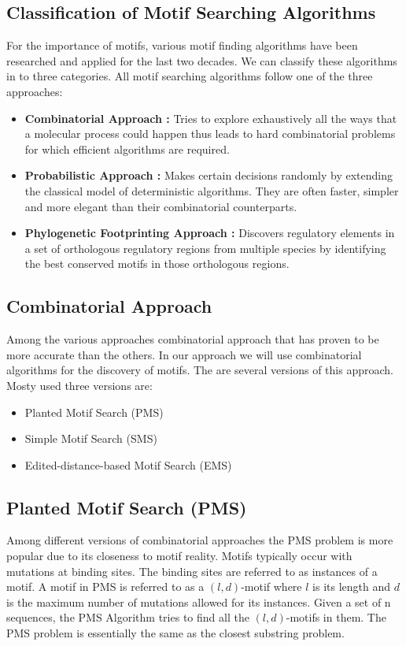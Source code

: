 \subsection{Classification of Motif Searching Algorithms}
For the importance of motifs, various motif finding algorithms have been researched and applied for the last two decades. We can classify these algorithms in to three categories. All motif searching algorithms follow one of the three approaches:
\begin{itemize}
	\item \textbf{Combinatorial Approach :} Tries to explore exhaustively all the ways that a molecular process could happen thus leads to hard combinatorial problems for which efficient algorithms are required.
	\item \textbf{Probabilistic Approach :} Makes certain decisions randomly by extending the classical model of deterministic algorithms. They are often faster, simpler and more elegant than their	combinatorial counterparts. 
	\item \textbf{Phylogenetic Footprinting Approach :} Discovers regulatory elements in a set of orthologous regulatory regions from multiple species by identifying the best
	conserved motifs in those orthologous regions.
\end{itemize}

\subsection{Combinatorial Approach}
Among the various approaches combinatorial approach that has proven to be more accurate than the others. In our approach we will use combinatorial algorithms for the discovery of motifs. The are several versions of this approach. Mosty used three versions are:
\begin{itemize}
	\item Planted Motif Search (PMS)
	\item Simple Motif Search (SMS)
	\item Edited-distance-based Motif Search (EMS)~\cite{rajasekaran20091}
\end{itemize}

\subsection{Planted Motif Search (PMS)}
Among different versions of combinatorial approaches the PMS problem is more popular due to its closeness to motif reality.  Motifs typically occur with mutations at binding sites. The binding sites are referred to as instances of a motif. A motif in PMS is referred to as a $ (l, d) $-motif where $ l $ is its length and $ d $ is the
maximum number of mutations allowed for its instances. Given a set of n sequences, the PMS Algorithm tries to find all the $ (l, d) $-motifs in them. The PMS problem is essentially the same as the closest substring problem.


